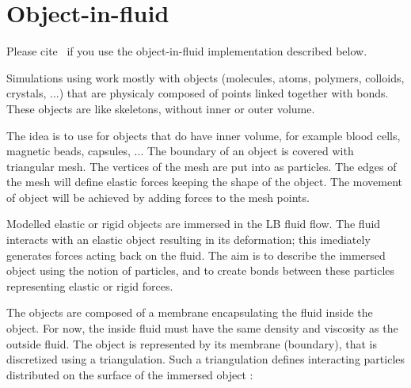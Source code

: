 %  
%   
%  
%  
%

\chapter{Object-in-fluid}
\label{sec:fsi}

\begin{citebox}
  Please cite~ if you use the object-in-fluid implementation described below.
\end{citebox}


Simulations using \es work mostly with objects (molecules, atoms, 
polymers, colloids, crystals, ...) that are physicaly composed of points linked 
together with bonds. These objects are like skeletons, without inner or outer volume. 

The idea is to use \es for objects that do have inner volume, for example blood cells, 
magnetic beads, capsules, ... The boundary of an object is covered with triangular 
mesh. The vertices of the mesh are put into \es as particles. The edges of the mesh 
will define elastic forces keeping the shape of the object. The movement of 
object will be achieved by adding forces to the mesh points.

Modelled elastic or rigid objects are immersed in the LB fluid flow. The fluid interacts 
with an elastic object resulting in its deformation; this imediately generates forces 
acting back on the fluid. The aim is to describe the immersed object using the notion of 
particles, and to create bonds between these particles representing elastic or rigid 
forces.

The objects are composed of a membrane encapsulating the fluid inside the object. For 
now, the inside fluid must have the same density and viscosity as the outside fluid. 
The object is represented by its membrane (boundary), that is discretized using a 
triangulation. Such a triangulation defines interacting particles distributed 
on the surface of the immersed object \cite{dupin07}:

